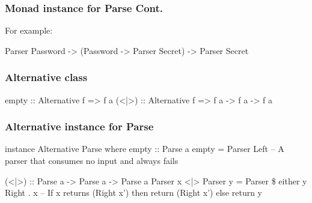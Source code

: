 \documentclass{beamer}
\begin{document}
\begin{frame}
\frametitle{Monad instance for Parse Cont.}
For example:

Parser Password -> (Password -> Parser Secret) -> Parser Secret

%
%
%
%
\end{frame}


\begin{frame}
\frametitle{Alternative class}
%
%
empty :: Alternative f => f a
(<|>) :: Alternative f => f a -> f a -> f a
%
\end{frame}


\begin{frame}
\frametitle{Alternative instance for Parse}
instance Alternative Parse where
  empty :: Parse a
  empty = Parser Left
  -- A parser that consumes no input and always fails

  (<|>) :: Parse a -> Parse a -> Parse a
  Parser x <|> Parser y = Parser \$ either y Right . x
  -- If x returns (Right x') then return (Right x') else return y

%


%
%
\end{frame}
\end{document}
